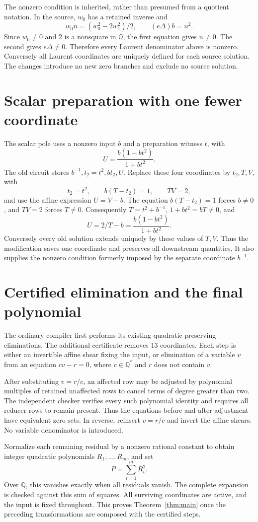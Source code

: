 \documentclass[11pt]{article}
\newcommand{\Q}{\mathbb Q}
\begin{document}
The nonzero condition is inherited, rather than presumed from a quotient notation. In the source, $w_0$ has a retained inverse and
\[
 w_0n=(w_0^2-2w_1^2)/2,\qquad (e\Delta)b=n^2.
\]
Since $w_0\ne0$ and 2 is a nonsquare in $\Q$, the first equation gives $n\ne0$. The second gives $e\Delta\ne0$. Therefore every Laurent denominator above is nonzero. Conversely all Laurent coordinates are uniquely defined for each source solution. The changes introduce no new zero branches and exclude no source solution.

\section{Scalar preparation with one fewer coordinate}
The scalar pole uses a nonzero input $b$ and a preparation witness $t$, with
\[
 U=\frac{b(1-bt^2)}{1+bt^2}.
\]
The old circuit stores $b^{-1},t_2=t^2,bt_2,U$. Replace these four coordinates by $t_2,T,V$, with
\[
 t_2=t^2,\qquad b(T-t_2)=1,\qquad TV=2,
\]
and use the affine expression $U=V-b$. The equation $b(T-t_2)=1$ forces $b\ne0$, and $TV=2$ forces $T\ne0$. Consequently $T=t^2+b^{-1}$, $1+bt^2=bT\ne0$, and
\[
 U=2/T-b=\frac{b(1-bt^2)}{1+bt^2}.
\]
Conversely every old solution extends uniquely by these values of $T,V$. Thus the modification saves one coordinate and preserves all downstream quantities. It also supplies the nonzero condition formerly imposed by the separate coordinate $b^{-1}$.

\section{Certified elimination and the final polynomial}
The ordinary compiler first performs its existing quadratic-preserving eliminations. The additional certificate removes 13 coordinates. Each step is either an invertible affine shear fixing the input, or elimination of a variable $v$ from an equation $cv-r=0$, where $c\in\Q^*$ and $r$ does not contain $v$.

After substituting $v=r/c$, an affected row may be adjusted by polynomial multiples of retained unaffected rows to cancel terms of degree greater than two. The independent checker verifies every such polynomial identity and requires all reducer rows to remain present. Thus the equations before and after adjustment have equivalent zero sets. In reverse, reinsert $v=r/c$ and invert the affine shears. No variable denominator is introduced.

Normalize each remaining residual by a nonzero rational constant to obtain integer quadratic polynomials $R_1,\ldots,R_m$, and set
\[
 P=\sum_{i=1}^mR_i^2.
\]
Over $\Q$, this vanishes exactly when all residuals vanish. The complete expansion is checked against this sum of squares. All surviving coordinates are active, and the input is fixed throughout. This proves Theorem~\ref{thm:main} once the preceding transformations are composed with the certified steps.
\end{document}
